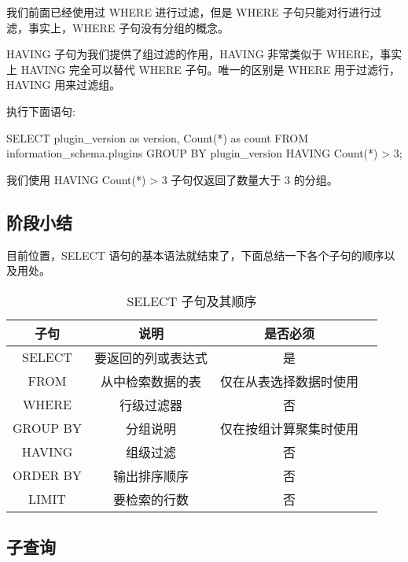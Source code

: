我们前面已经使用过 WHERE 进行过滤，但是 WHERE 子句只能对行进行过滤，事实上，WHERE 子句没有分组的概念。

HAVING 子句为我们提供了组过滤的作用，HAVING 非常类似于 WHERE，事实上 HAVING 完全可以替代 WHERE 子句。唯一的区别是 WHERE 用于过滤行，HAVING 用来过滤组。


执行下面语句:
\begin{sql}
SELECT plugin_version as version,
    Count(*) as count
FROM information_schema.plugins
GROUP BY plugin_version
HAVING Count(*) > 3;
\end{sql}

我们使用 HAVING Count(*) > 3 子句仅返回了数量大于 3 的分组。

\subsection{阶段小结}

目前位置，SELECT 语句的基本语法就结束了，下面总结一下各个子句的顺序以及用处。

\begin{table}[H]
    \centering
    \caption{SELECT 子句及其顺序}
    \label{table:SELECT 子句及其顺序}
    \setlength{\tabcolsep}{4mm}
    \begin{tabular}{c|c|cc}
        \toprule
        \textbf{子句} & \textbf{说明} & \textbf{是否必须} \\
        \midrule
        SELECT & 要返回的列或表达式 & 是 \\
        FROM & 从中检索数据的表 & 仅在从表选择数据时使用 \\
        WHERE & 行级过滤器 & 否 \\
        GROUP BY & 分组说明 & 仅在按组计算聚集时使用 \\
        HAVING & 组级过滤 & 否 \\
        ORDER BY & 输出排序顺序 & 否 \\
        LIMIT & 要检索的行数 & 否 \\
        \bottomrule
    \end{tabular}
\end{table}

\subsection{子查询}

